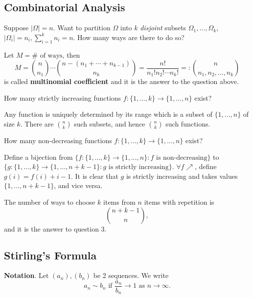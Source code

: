 \subsection{Combinatorial Analysis}

\begin{question}{1}
    Suppose $ |\Omega|=n $. Want to partition $ \Omega $ into $k$ \textit{disjoint} subsets $ \Omega_1,\dots,\Omega_k$, $ |\Omega_i|=n_i, \sum_{i=1}^{k}n_i=n $. How many ways are there to do so?
\end{question}

\begin{definition}
    Let $ M=\# \text{ of ways} $, then 
    \[
        M= \binom{n}{n_1}\cdots \binom{n-(n_1+\cdots+n_{k-1})}{n_k} = \frac{n!}{n_1!n_2!\cdots n_k!}
        =: \binom{n}{n_1,n_2,\dots,n_k}
    \]
    is called \textbf{multinomial coefficient} and it is the answer to the question above.
\end{definition}

\begin{question}{2}
    How many strictly increasing functions $ f: \{1,\dots,k\} \to \{1,\dots,n\}$ exist?
\end{question}

Any function is uniquely determined by its range which is a subset of $ \{1,\dots,n\} $ of size $k$. There are $ \binom{n}{k} $ such subsets, and hence $ \binom{n}{k} $ such functions.

\begin{question}{3}
    How many non-decreasing functions $ f: \{1,\dots,k\} \to \{1,\dots,n\}$ exist?
\end{question}

Define a bijection from $ \{f: \{1,\dots,k\}\to \{1,\dots,n\}: f \text{ is non-decreasing}\} $ to $ \{g: \{1,\dots,k\}\to \{1,\dots,n+k-1\}: g \text{ is strictly increasing}\} $. $ \forall f \nearrow $, define $ g(i)=f(i)+i-1 $. It is clear that $g$ is strictly increasing and takes values $ \{1,\dots,n+k-1\} $, and vice versa.
\begin{proposition}\label{prop:Combination with Repetition}
    The number of ways to choose $k$ items from $n$ items with repetition is 
    \[
        \binom{n+k-1}{n},
    \]
    and it is the answer to question 3.
\end{proposition}
\subsection{Stirling's Formula}
\textbf{Notation}. Let $(a_n),(b_n)$ be 2 sequences. We write 
\[
    a_n \sim b_n \text{ if } \frac{a_n}{b_n} \to 1 \text{ as }n \to \infty .
\]

